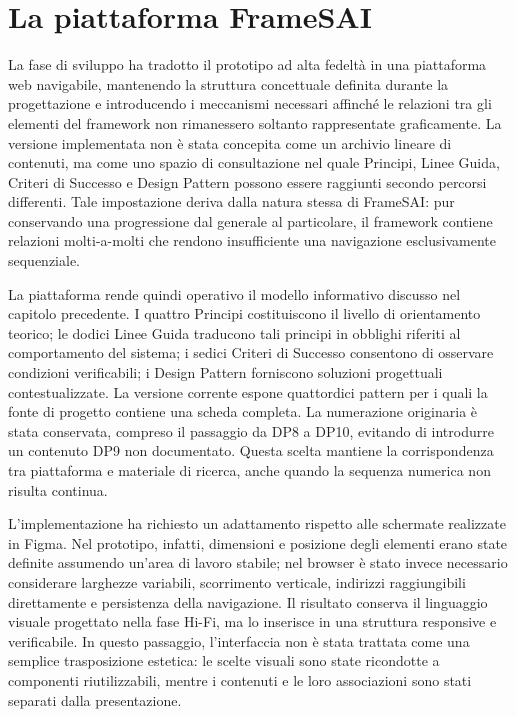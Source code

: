 \chapter{La piattaforma FrameSAI}

La fase di sviluppo ha tradotto il prototipo ad alta fedeltà in una piattaforma web navigabile, mantenendo la struttura concettuale definita durante la progettazione e introducendo i meccanismi necessari affinché le relazioni tra gli elementi del framework non rimanessero soltanto rappresentate graficamente. La versione implementata non è stata concepita come un archivio lineare di contenuti, ma come uno spazio di consultazione nel quale Principi, Linee Guida, Criteri di Successo e Design Pattern possono essere raggiunti secondo percorsi differenti. Tale impostazione deriva dalla natura stessa di FrameSAI: pur conservando una progressione dal generale al particolare, il framework contiene relazioni molti-a-molti che rendono insufficiente una navigazione esclusivamente sequenziale.

La piattaforma rende quindi operativo il modello informativo discusso nel capitolo precedente. I quattro Principi costituiscono il livello di orientamento teorico; le dodici Linee Guida traducono tali principi in obblighi riferiti al comportamento del sistema; i sedici Criteri di Successo consentono di osservare condizioni verificabili; i Design Pattern forniscono soluzioni progettuali contestualizzate. La versione corrente espone quattordici pattern per i quali la fonte di progetto contiene una scheda completa. La numerazione originaria è stata conservata, compreso il passaggio da DP8 a DP10, evitando di introdurre un contenuto DP9 non documentato. Questa scelta mantiene la corrispondenza tra piattaforma e materiale di ricerca, anche quando la sequenza numerica non risulta continua.

L'implementazione ha richiesto un adattamento rispetto alle schermate realizzate in Figma. Nel prototipo, infatti, dimensioni e posizione degli elementi erano state definite assumendo un'area di lavoro stabile; nel browser è stato invece necessario considerare larghezze variabili, scorrimento verticale, indirizzi raggiungibili direttamente e persistenza della navigazione. Il risultato conserva il linguaggio visuale progettato nella fase Hi-Fi, ma lo inserisce in una struttura responsive e verificabile. In questo passaggio, l'interfaccia non è stata trattata come una semplice trasposizione estetica: le scelte visuali sono state ricondotte a componenti riutilizzabili, mentre i contenuti e le loro associazioni sono stati separati dalla presentazione.

